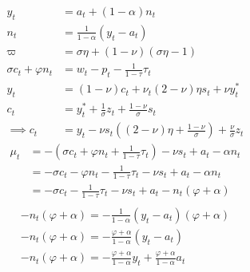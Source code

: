 \begin{align}
    y_t &= a_t + (1-\alpha)n_t\\
    n_t &= \frac{1}{1-\alpha}(y_t - a_t)\\
    \varpi &= \sigma \eta + (1-\nu)(\sigma \eta - 1)\\
    \sigma c_t + \varphi n_t &= w_t - p_t - \frac{1}{1-\tau}\tau_t\\
    y_t &= (1-\nu)c_t + \nu_t(2-\nu)\eta s_t + \nu y_t^*\\
    c_t &= y_t^* + \frac{1}{\sigma}z_t + \frac{1-\nu}{\sigma}s_t\\
    \implies c_t &= y_t - \nu s_t \left( (2-\nu)\eta + \frac{1-\nu}{\sigma}\right) + \frac{\nu}{\sigma}z_t
\end{align}
\begin{align}
    \mu_t &= -(\sigma c_t + \varphi n_t + \frac{1}{1-\tau}\tau_t) - \nu s_t + a_t - \alpha n_t\\
    &= -\sigma c_t - \varphi n_t - \frac{1}{1-\tau}\tau_t - \nu s_t + a_t - \alpha n_t\\
    &= -\sigma c_t - \frac{1}{1-\tau}\tau_t - \nu s_t + a_t - n_t(\varphi + \alpha)\\
\end{align}
\begin{align}
    -n_t(\varphi + \alpha) = -\frac{1}{1-\alpha}(y_t - a_t)(\varphi + \alpha)\\
    -n_t(\varphi + \alpha) = -\frac{\varphi + \alpha}{1-\alpha}(y_t - a_t)\\
    -n_t(\varphi + \alpha) = -\frac{\varphi + \alpha}{1-\alpha}y_t + \frac{\varphi + \alpha}{1-\alpha}a_t\\
\end{align}

